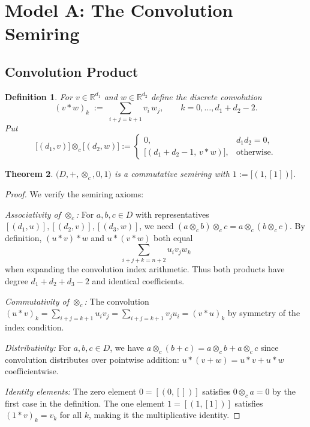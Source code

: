 \documentclass[11pt]{article}
\newtheorem{theorem}{Theorem}[section]
\newtheorem{definition}[theorem]{Definition}
\begin{document}
\section{Model A: The Convolution Semiring}
\label{sec:modelA}
\subsection{Convolution Product}
\begin{definition}
For \(v\in\mathbb R^{d_1}\) and \(w\in\mathbb R^{d_2}\) define the discrete convolution
\[
  (v\ast w)_k \;:=\;\sum_{i+j=k+1} v_i\,w_j,\qquad k=0,\dots,d_1+d_2-2.
\]
Put
\[
  \bigl[(d_1,v)\bigr]\otimes_c\bigl[(d_2,w)\bigr]
  :=\begin{cases}
       0, & d_1d_2=0, \\
       \bigl[(d_1+d_2-1,\,v\ast w)\bigr], & \text{otherwise.}
     \end{cases}
\]
\end{definition}


\begin{theorem}\label{thm:convSemiring}
\(\bigl(D,+,
\otimes_c,0,1\bigr)\) is a commutative semiring with \(1:=\bigl[(1,[1])\bigr]\).
\end{theorem}
\begin{proof}
We verify the semiring axioms:

\textit{Associativity of $\otimes_c$:} For $a, b, c \in D$ with representatives $[(d_1,u)], [(d_2,v)], [(d_3,w)]$, we need $(a \otimes_c b) \otimes_c c = a \otimes_c (b \otimes_c c)$. By definition, $(u \ast v) \ast w$ and $u \ast (v \ast w)$ both equal
\[
\sum_{i+j+k=n+2} u_i v_j w_k
\]
when expanding the convolution index arithmetic. Thus both products have degree $d_1 + d_2 + d_3 - 2$ and identical coefficients.

\textit{Commutativity of $\otimes_c$:} The convolution $(u \ast v)_k = \sum_{i+j=k+1} u_i v_j = \sum_{i+j=k+1} v_j u_i = (v \ast u)_k$ by symmetry of the index condition.

\textit{Distributivity:} For $a, b, c \in D$, we have $a \otimes_c (b + c) = a \otimes_c b + a \otimes_c c$ since convolution distributes over pointwise addition: $u \ast (v + w) = u \ast v + u \ast w$ coefficientwise.

\textit{Identity elements:} The zero element $0 = [(0,[])]$ satisfies $0 \otimes_c a = 0$ by the first case in the definition. The one element $1 = [(1,[1])]$ satisfies $(1 \ast v)_k = v_k$ for all $k$, making it the multiplicative identity.
\end{proof}
\end{document}
